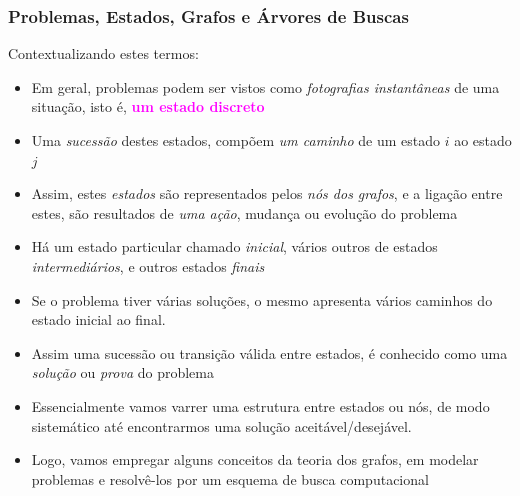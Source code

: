 \begin{frame}[fragile,  allowframebreaks=0.8]
\frametitle{Problemas, Estados, Grafos e  Árvores de Buscas}

Contextualizando estes termos:

\begin{itemize}

  \item Em geral, problemas podem ser vistos como \textit{fotografias 
  instantâneas} de uma situação, isto é, \textcolor{magenta}{\textbf{um estado discreto}}
   
  \item Uma \textit{sucessão} destes estados, compõem \textit{um caminho} de um estado $i$ ao estado $j$
  
  \item Assim, estes \textit{estados} são representados pelos \textit{nós dos grafos}, e a ligação entre 
  estes, são resultados de \textit{uma ação}, mudança ou evolução do problema
  
  \item Há um estado particular chamado \textit{inicial},  vários outros de estados \textit{intermediários},
   e outros estados \textit{finais}
  
  \item Se o problema tiver várias soluções,  o mesmo apresenta vários caminhos do estado inicial ao  final.
  
  \item Assim uma sucessão ou transição válida entre estados, é conhecido como uma \textit{solução} ou \textit{prova}
     do problema

  \item Essencialmente vamos varrer uma estrutura
     entre estados ou nós, de modo sistemático até encontrarmos
     uma solução aceitável/desejável.

    \item Logo, vamos empregar alguns conceitos da teoria dos grafos, em modelar problemas e resolvê-los 
  por um esquema de busca computacional
  
    
\end{itemize}

\end{frame}




